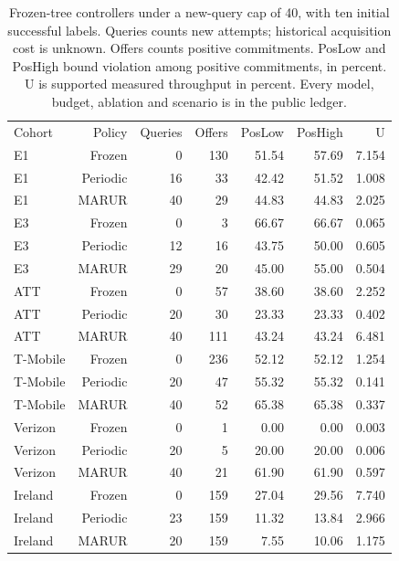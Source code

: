 \begin{table}[!ht]
\centering\small
\caption{Frozen-tree controllers under a new-query cap of 40, with ten initial successful labels. Queries counts new attempts; historical acquisition cost is unknown. Offers counts positive commitments. PosLow and PosHigh bound violation among positive commitments, in percent. U is supported measured throughput in percent. Every model, budget, ablation and scenario is in the public ledger.}
\begin{tabular}{lrrrrrr}
\hline
Cohort & Policy & Queries & Offers & PosLow & PosHigh & U \\
E1 & Frozen & 0 & 130 & 51.54 & 57.69 & 7.154 \\
E1 & Periodic & 16 & 33 & 42.42 & 51.52 & 1.008 \\
E1 & MARUR & 40 & 29 & 44.83 & 44.83 & 2.025 \\
E3 & Frozen & 0 & 3 & 66.67 & 66.67 & 0.065 \\
E3 & Periodic & 12 & 16 & 43.75 & 50.00 & 0.605 \\
E3 & MARUR & 29 & 20 & 45.00 & 55.00 & 0.504 \\
ATT & Frozen & 0 & 57 & 38.60 & 38.60 & 2.252 \\
ATT & Periodic & 20 & 30 & 23.33 & 23.33 & 0.402 \\
ATT & MARUR & 40 & 111 & 43.24 & 43.24 & 6.481 \\
T-Mobile & Frozen & 0 & 236 & 52.12 & 52.12 & 1.254 \\
T-Mobile & Periodic & 20 & 47 & 55.32 & 55.32 & 0.141 \\
T-Mobile & MARUR & 40 & 52 & 65.38 & 65.38 & 0.337 \\
Verizon & Frozen & 0 & 1 & 0.00 & 0.00 & 0.003 \\
Verizon & Periodic & 20 & 5 & 20.00 & 20.00 & 0.006 \\
Verizon & MARUR & 40 & 21 & 61.90 & 61.90 & 0.597 \\
Ireland & Frozen & 0 & 159 & 27.04 & 29.56 & 7.740 \\
Ireland & Periodic & 23 & 159 & 11.32 & 13.84 & 2.966 \\
Ireland & MARUR & 20 & 159 & 7.55 & 10.06 & 1.175 \\
\hline
\end{tabular}
\end{table}
